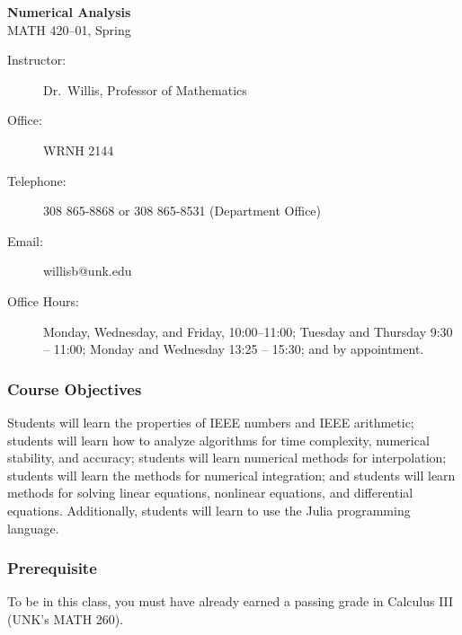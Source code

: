 \documentclass[12pt,fullpage]{article}
\newcounter{ex}\setcounter{ex}{0}
\begin{document}
\large
\begin{center}
    \textbf{Numerical Analysis}  \\
    {MATH 420--01, Spring \the\year} \\
\end{center}

\vskip0.25in
\normalsize

\begin{center}
\begin{description}
    \item[Instructor:] Dr.\  Willis, Professor of Mathematics
    \item[Office:]  WRNH 2144 
    \item[Telephone:] 308 865-8868 or 308 865-8531 (Department Office)
   \item[Email:] willisb@unk.edu
   \item[Office Hours:] Monday, Wednesday, and  Friday, \mbox{10:00--11:00}; Tuesday and Thursday 9:30 -- 11:00; Monday and Wednesday 13:25 -- 15:30;  and by appointment.
  
\end{description}
\end{center}



\subsubsection*{Course Objectives}

 Students will learn the properties of IEEE numbers and IEEE arithmetic; students will learn how to analyze algorithms for time complexity, numerical stability,  and accuracy; students will learn numerical methods
for interpolation;  students will learn the methods for numerical integration;  and students will learn methods for solving linear equations, nonlinear equations, and differential equations. Additionally, students will learn to 
use the Julia programming language.

\subsubsection*{Prerequisite}

To be in this class, you must have already earned a passing grade in Calculus III (UNK's MATH 260).
\end{document}
